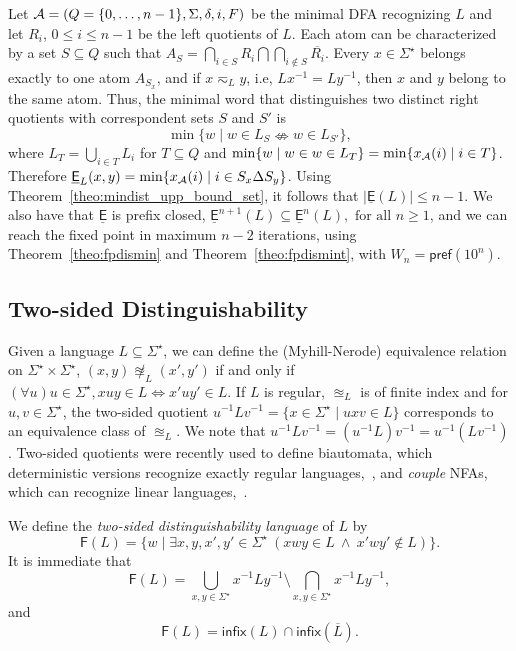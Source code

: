 \documentclass{article}
\newcommand{\dfa}{DFA\xspace}
\newcommand{\nfas}{NFAs\xspace}
\newcommand{\comp}[1]{\overline{#1}}
\newcommand{\preff}[1]{\mathsf{pref}(#1)}
\newcommand{\inff}[1]{\mathsf{infix}(#1)}
\newcommand{\dpremin}[1]{\underline{\mathsf{E}}(#1)}
\newcommand{\dpreminw}[2]{\underline{\mathsf{E}}_{#1}(#2)}
\newcommand{\dpremino}{\underline{\mathsf{E}}}
\newcommand{\dpreminp}[2]{\underline{\mathsf{E}}^{#2}{(#1)}}
\newcommand{\dinf}[1]{\mathsf{F}(#1)}
\newcommand{\notequiv}{\nLeftrightarrow}
\newcommand{\mnleq}[1]{\eqsim_{#1}}
\newcommand{\mntseq}[1]{\approxeq_{#1}}
\newcommand{\kleene}[1]{#1^\star}
\begin{document}
 Let ${\cal A}=(Q=\{0,\ldots,n-1\},\Sigma,\delta,i,F)$ be the minimal \dfa recognizing $L$ and let $R_i$, $0\leq i\leq n-1$ be the left quotients of $L$. 
Each atom can be characterized by a set $S\subseteq Q$ such that 
$A_{S}=\bigcap_{i\in S}R_i\bigcap \bigcap_{i\notin S}\comp{R_i}$.
Every  $x\in \Sigma^\star$ belongs exactly to one atom $A_{S_x}$, and if $x\mnleq{L} y$, i.e, $Lx^{-1}=Ly^{-1}$, 
then $x$ and $y$ belong to the same atom. 
Thus, the minimal word that distinguishes two distinct right quotients with correspondent  sets $S$ and $S'$ is 
$$\min\{w \mid w\in L_{S} \notequiv w\in L_{S'}\},$$ 
where $L_T=\bigcup_{i\in T}L_i$ for $T \subseteq Q$ and $\min\{w\mid w \in w\in L_T\}=\min\{x_{\cal A}(i)\mid i\in T\}$. 
Therefore $\dpreminw{L}{x,y}=\min\{x_{\cal A}(i)\mid i \in S_x\Delta S_y\}$. 
Using Theorem~\ref{theo:mindist_upp_bound_set}, it follows that $|\dpremin{L}|\leq n -1$. 
We also have that $\dpremino$ is prefix closed, $\dpreminp{L}{n+1}\subseteq \dpreminp{L}{n},\mbox{ for  all }n\geq 1$,  
and we can reach the fixed point in maximum $n-2$ iterations, using Theorem~\ref{theo:fpdismin} and 
Theorem~\ref{theo:fpdismint}, with  $W_n=\preff{10^n}$.

\subsection{Two-sided Distinguishability}
\label{sec:twosideddis}
Given a language $L\subseteq \Sigma^\star$, we can define the (Myhill-Nerode) equivalence relation on $\Sigma^\star\times \Sigma^\star$, 
$(x,y)\not\mntseq{L}(x',y')$ if and only if 
$(\forall u)u\in \Sigma^\star,xuy\in L \Leftrightarrow x'uy'\in L$. If $L$ is regular, $\mntseq{L}$ is of finite index and for $u,v\in \Sigma^\star$, the two-sided quotient $u^{-1}Lv^{-1}=\{x\in \Sigma^\star \mid uxv \in L\}$ corresponds to an equivalence class of $\mntseq{L}$.
We note that $u^{-1}Lv^{-1}=(u^{-1}L)v^{-1}=u^{-1}(Lv^{-1})$.
Two-sided quotients were recently used to define biautomata, which deterministic versions recognize exactly regular languages,~\cite{holzer13:_nondet_biaut_and_their_descr_compl,klima12:_biaut}, and \emph{couple} \nfas,
  which can recognize linear languages,~\cite{champarnaud13:_two_sided_deriv_for_regul}.

We define
the \emph{two-sided distinguishability language} of $L$ by 
\begin{equation}
\label{eq:disleftB}
\dinf{L}=\{w\mid \exists x,y,x',y'\in \Sigma^\star \ (xwy \in L\ \wedge \ x'wy'
\notin L)\}.
\end{equation}
\noindent It is immediate that 
\begin{equation*}
 \dinf{L} = \bigcup_{x,y\in\kleene{\Sigma}}x^{-1}Ly^{-1}\setminus
 \bigcap_{x,y\in\kleene{\Sigma}}x^{-1}Ly^{-1}, 
\end{equation*}
and
\begin{equation*}
 \dinf{L}=\inff{L}\cap\inff{\comp{L}}.
 \end{equation*}
\end{document}
